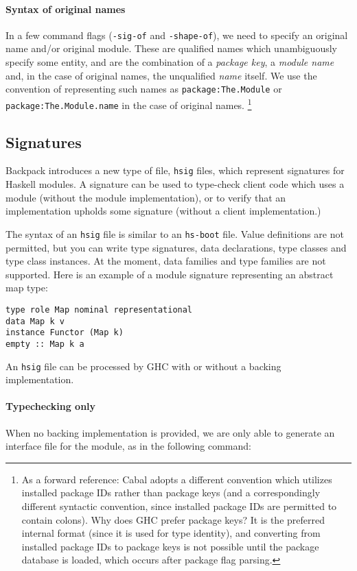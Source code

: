 \documentclass{article}
\begin{document}
\paragraph{Syntax of original names}  In a few command flags
(\texttt{-sig-of} and \texttt{-shape-of}), we need to specify an
original name and/or original module.  These are qualified names which
unambiguously specify some entity, and are the combination of a
\emph{package key}, a \emph{module name} and, in the case of original
names, the unqualified \emph{name} itself.  We use the convention of
representing such names as \texttt{package:The.Module} or
\texttt{package:The.Module.name} in the case of original names.%
\footnote{As a forward reference: Cabal adopts a different convention which
utilizes installed package IDs rather than package keys (and a
correspondingly different syntactic convention, since installed package
IDs are permitted to contain colons).  Why does GHC prefer package keys?
It is the preferred internal format (since it is used for type
identity), and converting from installed package IDs to package keys is
not possible until the package database is loaded, which occurs after
package flag parsing.}

\subsection{Signatures}

Backpack introduces a new type of file, \texttt{hsig} files, which
represent signatures for Haskell modules.  A signature can be used
to type-check client code which uses a module (without the module
implementation), or to verify that an implementation upholds some
signature (without a client implementation.)

The syntax of an \texttt{hsig} file is similar to an \texttt{hs-boot}
file.  Value definitions are not permitted, but you can write type
signatures, data declarations, type classes and type class instances.
At the moment, data families and type families are not supported.  Here
is an example of a module signature representing an abstract map type:

\begin{verbatim}
type role Map nominal representational
data Map k v
instance Functor (Map k)
empty :: Map k a
\end{verbatim}

An \texttt{hsig} file can be processed by GHC with or without a backing
implementation.

\paragraph{Typechecking only} When no backing implementation is provided, we are
only able to generate an interface file for the module, as in the
following command:
\end{document}
